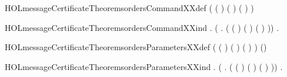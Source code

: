 \newcommand{\HOLmessageCertificateTheoremsmsgSatXXthm}{\UseVerbatim{HOLmessageCertificateTheoremsmsgSatXXthm}}
\begin{SaveVerbatim}{HOLmessageCertificateTheoremsordersCommandXXdef}
\HOLTokenTurnstile{} 
     ( ( ) ( ) ( ) ) \HOLSymConst{=}
\end{SaveVerbatim}
\newcommand{\HOLmessageCertificateTheoremsordersCommandXXdef}{\UseVerbatim{HOLmessageCertificateTheoremsordersCommandXXdef}}
\begin{SaveVerbatim}{HOLmessageCertificateTheoremsordersCommandXXind}
\HOLTokenTurnstile{} \HOLSymConst{\HOLTokenForall{}}.
     (\HOLSymConst{\HOLTokenForall{}}   .
         ( ( ) ( ) ( ) )) \HOLSymConst{\HOLTokenImp{}}
     \HOLSymConst{\HOLTokenForall{}}.  
\end{SaveVerbatim}
\newcommand{\HOLmessageCertificateTheoremsordersCommandXXind}{\UseVerbatim{HOLmessageCertificateTheoremsordersCommandXXind}}
\begin{SaveVerbatim}{HOLmessageCertificateTheoremsordersParametersXXdef}
\HOLTokenTurnstile{} 
     ( ( ) ( ) ( ) ) \HOLSymConst{=}
   (\HOLSymConst{,}\HOLSymConst{,})
\end{SaveVerbatim}
\newcommand{\HOLmessageCertificateTheoremsordersParametersXXdef}{\UseVerbatim{HOLmessageCertificateTheoremsordersParametersXXdef}}
\begin{SaveVerbatim}{HOLmessageCertificateTheoremsordersParametersXXind}
\HOLTokenTurnstile{} \HOLSymConst{\HOLTokenForall{}}.
     (\HOLSymConst{\HOLTokenForall{}}   .
         ( ( ) ( ) ( ) )) \HOLSymConst{\HOLTokenImp{}}
     \HOLSymConst{\HOLTokenForall{}}.  
\end{SaveVerbatim}
